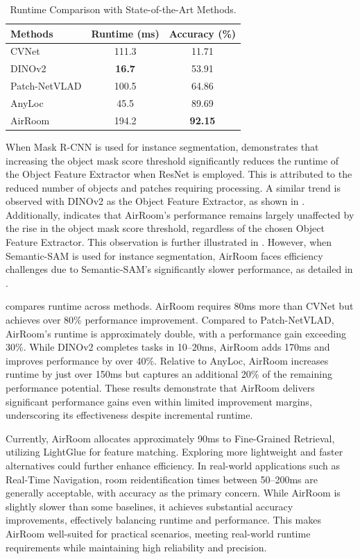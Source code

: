 \begin{table}[ht]
\centering
\begin{tabular}{l|c|c}
\toprule
\textbf{Methods} & \textbf{Runtime (ms)} & \textbf{Accuracy (\%)}\\
\midrule
CVNet & 111.3 & 11.71 \\
DINOv2 & \textbf{16.7} & 53.91 \\
Patch-NetVLAD & 100.5 & 64.86 \\
AnyLoc & 45.5 & 89.69 \\
\rowcolor{Lavender} AirRoom & 194.2 & \textbf{92.15} \\
\bottomrule
\end{tabular}
\caption{Runtime Comparison with State-of-the-Art Methods.}
\label{tab:runtime_comparison}
\end{table}

When Mask R-CNN is used for instance segmentation,  demonstrates that increasing the object mask score threshold significantly reduces the runtime of the Object Feature Extractor when ResNet is employed. This is attributed to the reduced number of objects and patches requiring processing. A similar trend is observed with DINOv2 as the Object Feature Extractor, as shown in . Additionally,  indicates that AirRoom's performance remains largely unaffected by the rise in the object mask score threshold, regardless of the chosen Object Feature Extractor. This observation is further illustrated in . However, when Semantic-SAM is used for instance segmentation, AirRoom faces efficiency challenges due to Semantic-SAM's significantly slower performance, as detailed in .

 compares runtime across methods. AirRoom requires 80ms more than CVNet but achieves over 80\% performance improvement. Compared to Patch-NetVLAD, AirRoom's runtime is approximately double, with a performance gain exceeding 30\%. While DINOv2 completes tasks in 10–20ms, AirRoom adds 170ms and improves performance by over 40\%. Relative to AnyLoc, AirRoom increases runtime by just over 150ms but captures an additional 20\% of the remaining performance potential. These results demonstrate that AirRoom delivers significant performance gains even within limited improvement margins, underscoring its effectiveness despite incremental runtime.

Currently, AirRoom allocates approximately 90ms to Fine-Grained Retrieval, utilizing LightGlue for feature matching. Exploring more lightweight and faster alternatives could further enhance efficiency. In real-world applications such as Real-Time Navigation, room reidentification times between 50–200ms are generally acceptable, with accuracy as the primary concern. While AirRoom is slightly slower than some baselines, it achieves substantial accuracy improvements, effectively balancing runtime and performance. This makes AirRoom well-suited for practical scenarios, meeting real-world runtime requirements while maintaining high reliability and precision.